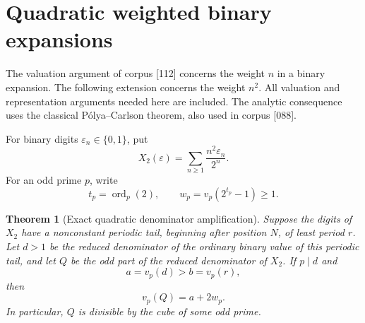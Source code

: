 \documentclass[11pt,a4paper]{article}
\newtheorem{theorem}{Theorem}[section]
\theoremstyle{definition}
\theoremstyle{remark}
\numberwithin{equation}{section}
\begin{document}
\section{Quadratic weighted binary expansions}
\label{disc:quadratic}

The valuation argument of corpus [112] concerns the weight $n$ in a
binary expansion.  The following extension concerns the weight $n^2$.
All valuation and representation arguments needed here are included.
The analytic consequence uses the classical P\'olya--Carlson theorem,
also used in corpus [088].

For binary digits $\varepsilon_n\in\{0,1\}$, put
\[
 X_2(\varepsilon)=\sum_{n\ge1}\frac{n^2\varepsilon_n}{2^n}.
\]
For an odd prime $p$, write
\[
 t_p=\operatorname{ord}_p(2),\qquad
 w_p=v_p(2^{t_p}-1)\ge1.
\]

\begin{theorem}[Exact quadratic denominator amplification]
\label{disc:amplification}
Suppose the digits of $X_2$ have a nonconstant periodic tail, beginning
after position $N$, of least period $r$.  Let $d>1$ be the reduced
denominator of the ordinary binary value of this periodic tail, and let
$Q$ be the odd part of the reduced denominator of $X_2$.  If $p\mid d$
and
\[
 a=v_p(d)>b=v_p(r),
\]
then
\[
 \boxed{v_p(Q)=a+2w_p.}
\]
In particular, $Q$ is divisible by the cube of some odd prime.
\end{theorem}
\end{document}
